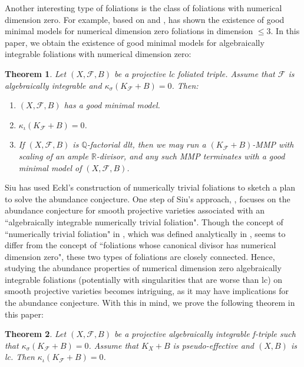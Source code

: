 \documentclass[11pt]{amsart}
\numberwithin{equation}{section}
\newcommand{\Qq}{\mathbb{Q}}
\newcommand{\Rr}{\mathbb{R}}
\newcommand{\Ff}{\mathcal{F}}
\newtheorem{thm}{Theorem}[subsection]
\theoremstyle{definition}
\theoremstyle{definition}
\theoremstyle{definition}
\begin{document}
Another interesting type of foliations is the class of foliations with numerical dimension zero. For example, based on \cite[Theorem 1.4]{CS20} and \cite[Theorem 1.7]{CS21}, \cite[Theorem 1.9]{LLM23} has shown the existence of good minimal models for numerical dimension zero foliations in dimension $\leq 3$. In this paper, we obtain the existence of good minimal models for algebraically integrable foliations with numerical dimension zero:
\begin{thm}\label{thm: gmm ai num0}
    Let $(X,\Ff,B)$ be a projective lc foliated triple. Assume that $\Ff$ is algebraically integrable and $\kappa_{\sigma}(K_{\Ff}+B)=0$. Then:
   \begin{enumerate}
       \item $(X,\Ff,B)$ has a good minimal model.
       \item $\kappa_{\iota}(K_{\Ff}+B)=0$.
       \item If $(X,\Ff,B)$ is $\Qq$-factorial dlt, then we may run a $(K_{\Ff}+B)$-MMP with scaling of an ample $\Rr$-divisor, and any such MMP terminates with a good minimal model of $(X,\Ff,B)$.
   \end{enumerate}
\end{thm}

Siu \cite{Siu10} has used Eckl’s construction of numerically trivial foliations \cite{Eck04} to sketch a plan to solve the abundance conjecture. One step of Siu's approach, \cite[(4.1)]{Siu10}, focuses on the abundance conjecture for smooth projective varieties associated with an ``algebraically integrable numerically trivial foliation". Though the concept of ``numerically trivial foliation" in \cite{Siu10}, which was defined analytically in \cite{Eck04}, seems to differ from the concept of ``foliations whose canonical divisor has numerical dimension zero", these two types of foliations are closely connected. Hence, studying the abundance properties of numerical dimension zero algebraically integrable foliations (potentially with singularities that are worse than lc) on smooth projective varieties becomes intriguing, as it may have implications for the abundance conjecture. With this in mind, we prove the following theorem in this paper:

\begin{thm}\label{thm: abundance num 0 no restriction to f}
    Let $(X,\Ff,B)$ be a projective algebraically integrable f-triple such that $\kappa_{\sigma}(K_{\Ff}+B)=0$. Assume that $K_X+B$ is pseudo-effective and $(X,B)$ is lc. Then $\kappa_{\iota}(K_{\Ff}+B)=0$.
\end{thm}
\end{document}
